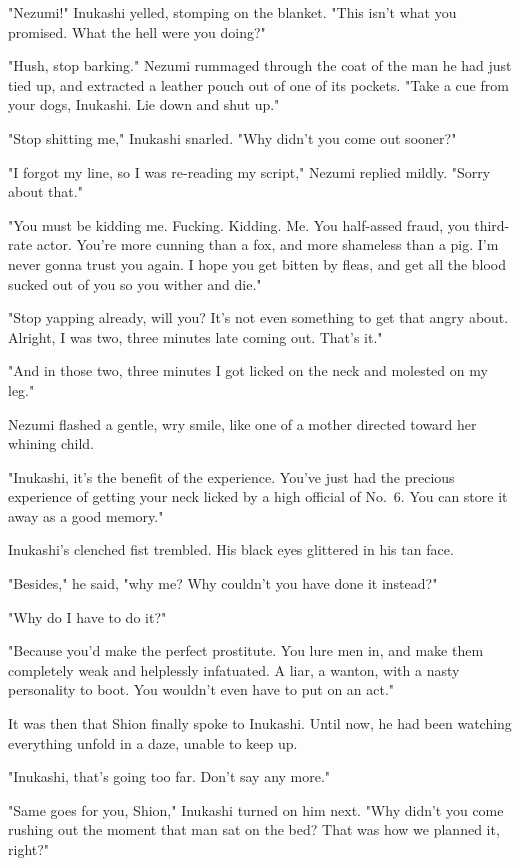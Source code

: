 \mybreak

"Nezumi!" Inukashi yelled, stomping on the blanket. "This isn't what you
promised. What the hell were you doing?"

"Hush, stop barking." Nezumi rummaged through the coat of the man he had
just tied up, and extracted a leather pouch out of one of its pockets.
"Take a cue from your dogs, Inukashi. Lie down and shut up."

"Stop shitting me," Inukashi snarled. "Why didn't you come out sooner?"

"I forgot my line, so I was re-reading my script," Nezumi replied
mildly. "Sorry about that."

"You must be kidding me. Fucking. Kidding. Me. You half-assed fraud, you
third-rate actor. You're more cunning than a fox, and more shameless
than a pig. I'm never gonna trust you again. I hope you get bitten by
fleas, and get all the blood sucked out of you so you wither and die."

"Stop yapping already, will you? It's not even something to get that
angry about. Alright, I was two, three minutes late coming out. That's
it."

"And in those two, three minutes I got licked on the neck and molested
on my leg."

Nezumi flashed a gentle, wry smile, like one of a mother directed toward
her whining child.

"Inukashi, it's the benefit of the experience. You've just had the
precious experience of getting your neck licked by a high official of
No.~6. You can store it away as a good memory."

Inukashi's clenched fist trembled. His black eyes glittered in his tan
face.

"Besides," he said, "why me? Why couldn't you have done it instead?"

"Why do I have to do it?"

"Because you'd make the perfect prostitute. You lure men in, and make
them completely weak and helplessly infatuated. A liar, a wanton, with a
nasty personality to boot. You wouldn't even have to put on an act."

It was then that Shion finally spoke to Inukashi. Until now, he had been
watching everything unfold in a daze, unable to keep up.

"Inukashi, that's going too far. Don't say any more."

"Same goes for you, Shion," Inukashi turned on him next. "Why didn't you
come rushing out the moment that man sat on the bed? That was how we
planned it, right?"

